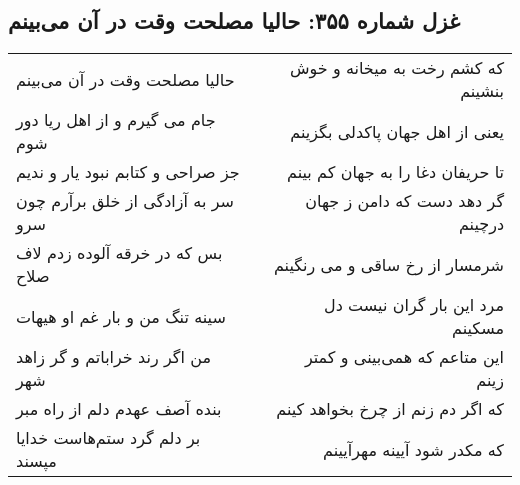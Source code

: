 \begin{center}
\section*{غزل شماره ۳۵۵: حالیا مصلحت وقت در آن می‌بینم}
\label{sec:sh355}
\begin{longtable}{l p{0.5cm} r}
حالیا مصلحت وقت در آن می‌بینم
&&
که کشم رخت به میخانه و خوش بنشینم
\\
جام می گیرم و از اهل ریا دور شوم
&&
یعنی از اهل جهان پاکدلی بگزینم
\\
جز صراحی و کتابم نبود یار و ندیم
&&
تا حریفان دغا را به جهان کم بینم
\\
سر به آزادگی از خلق برآرم چون سرو
&&
گر دهد دست که دامن ز جهان درچینم
\\
بس که در خرقه آلوده زدم لاف صلاح
&&
شرمسار از رخ ساقی و می رنگینم
\\
سینه تنگ من و بار غم او هیهات
&&
مرد این بار گران نیست دل مسکینم
\\
من اگر رند خراباتم و گر زاهد شهر
&&
این متاعم که همی‌بینی و کمتر زینم
\\
بنده آصف عهدم دلم از راه مبر
&&
که اگر دم زنم از چرخ بخواهد کینم
\\
بر دلم گرد ستم‌هاست خدایا مپسند
&&
که مکدر شود آیینه مهرآیینم
\\
\end{longtable}
\end{center}
